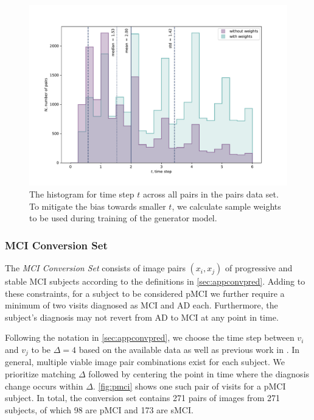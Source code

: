 \begin{figure}[h]
	\centering
	\includegraphics[width=\linewidth]{images/timestep_plots/hist} 
	\caption{The histogram for time step $t$ across all pairs in the pairs data set. To mitigate the bias towards smaller $t$, we calculate sample weights to be used during training of the generator model.}
	\label{fig:timestephist}
\end{figure}


\subsubsection*{MCI Conversion Set} \label{sec:datconv}
The \textit{MCI Conversion Set} consists of image pairs $(x_i, x_j)$ of progressive and stable MCI subjects according to the definitions in \autoref{sec:appconvpred}. Adding to these constraints, for a subject to be considered pMCI we further require a minimum of two visits diagnosed as MCI and AD each. Furthermore, the subject's diagnosis may not revert from AD to MCI at any point in time.

Following the notation in \ref{sec:appconvpred}, we choose the time step between $v_i$ and $v_j$ to be $\Delta = 4$ based on the available data as well as previous work in \cite{wegmayr2019generative}. In general, multiple viable image pair combinations exist for each subject. We prioritize matching $\Delta$ followed by centering the point in time where the diagnosis change occurs within $\Delta$. \autoref{fig:pmci} shows one such pair of visits for a pMCI subject. In total, the conversion set contains 271 pairs of images from 271 subjects, of which 98 are pMCI and 173 are sMCI.

